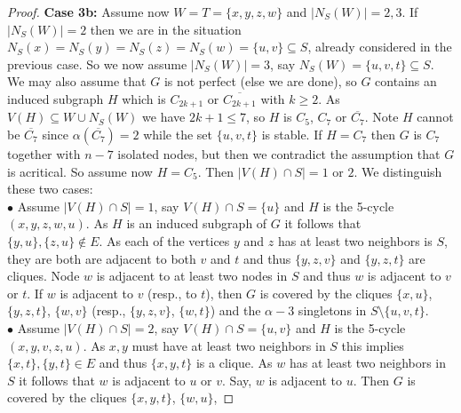 \documentclass[11pt]{article}
\numberwithin{equation}{section}
\begin{document}
\begin{proof}
{\bf Case 3b:} Assume now $W=T=\{x,y,z,w\}$ and $|N_S(W)|=2,3$. If $|N_S(W)|=2$ then we are in the situation $N_S(x)=N_S(y)=N_S(z)=N_S(w)=\{u,v\}\subseteq S$, already considered in the previous case. So we now assume
        $|N_S(W)|=3$, say $N_S(W)=\{u,v,t\}\subseteq S$. 
        We may also assume that $G$ is not perfect (else we are done), so $G$ contains an induced subgraph $H$ which is $C_{2k+1}$ or $\overline {C_{2k+1}}$ with $k\ge 2$. As $V(H)\subseteq W\cup N_S(W)$ we have $2k+1\le 7$, so $H$ is $C_5$, $C_7$ or $\overline {C_7}$. Note $H$ cannot be $\overline {C_7}$ since $\alpha(\overline {C_7})=2$ while the set $\{u,v,t\}$ is stable. If $H=C_7$ then $G$ is $C_7$ together with $n-7$ isolated nodes, but then we contradict the assumption that $G$ is acritical. So assume now $H=C_5$. Then $|V(H)\cap S| =1$ or $2$. We distinguish these two cases:\\
$\bullet$   Assume $|V(H)\cap S|=1$, say $V(H)\cap S=\{u\}$ and $H$ is the 5-cycle
                $(x,y,z,w,u)$.
As $H$ is an induced subgraph of $G$ it follows that $\{y,u\},\{z,u\}\not\in E$. As   each of  the vertices $y$ and $z$ has at least two neighbors is $S$,  they are both  are adjacent to both $v$ and $t$ and thus $\{y,z,v\}$ and $\{y,z,t\}$ are cliques. Node $w$ is adjacent to at least two nodes in $S$ and thus $w$ is adjacent to $v$ or $t$. If $w$ is adjacent to $v$ (resp., to $t$), then $G$ is covered by the cliques $\{x,u\}$, $\{y,z,t\}$, $\{w,v\}$  (resp., $\{y,z,v\}$, $\{w,t\}$)  and the $\alpha-3$ singletons in $S\setminus \{u,v,t\}$.\\
$\bullet$ Assume $|V(H)\cap S|=2$, say $V(H)\cap S=\{u,v\}$ and $H$ is the 5-cycle $(x,y,v,z,u)$. As $x,y$ must have at least two neighbors in $S$ this implies $\{x,t\},\{y,t\}\in E$ and thus $\{x,y,t\}$ is a clique. As $w$ has at least two neighbors in $S$ it follows that $w$ is adjacent to $u$ or $v$. Say, $w$ is adjacent to $u$. Then $G$ is covered by the cliques $\{x,y,t\}$, $\{w,u\}$,

\end{proof}
\end{document}
